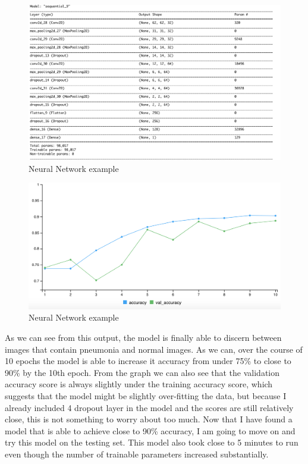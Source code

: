 \documentclass[12pt]{article}
\begin{document}
\begin{figure}

{\centering \includegraphics[width=0.75\linewidth,height=0.25\textheight]{images/model3} 

}

\caption{Neural Network example}\label{fig:sample-fig9}
\end{figure}

\begin{figure}

{\centering \includegraphics[width=0.75\linewidth,height=0.25\textheight]{images/model3out} 

}

\caption{Neural Network example}\label{fig:sample-fig10}
\end{figure}

As we can see from this output, the model is finally able to discern
between images that contain pneumonia and normal images. As we can, over
the course of 10 epochs the model is able to increase it accuracy from
under 75\% to close to 90\% by the 10th epoch. From the graph we can
also see that the validation accuracy score is always slightly under the
training accuracy score, which suggests that the model might be slightly
over-fitting the data, but because I already included 4 dropout layer in
the model and the scores are still relatively close, this is not
something to worry about too much. Now that I have found a model that is
able to achieve close to 90\% accuracy, I am going to move on and try
this model on the testing set. This model also took close to 5 minutes
to run even though the number of trainable parameters increased
substantially.
\end{document}
